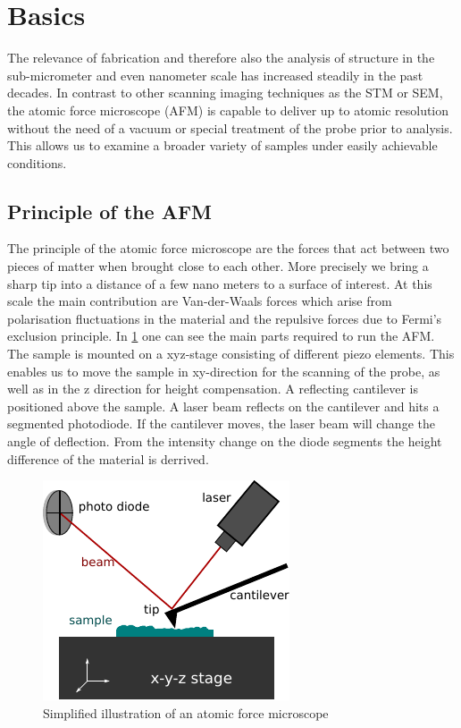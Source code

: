 \documentclass[paper=a4,fontsize=10pt,DIV=18,twocolumn,parskip=half]{scrartcl}
\numberwithin{equation}{section}    %
\begin{document}
\section{Basics}
The relevance of fabrication and therefore also the analysis of structure in the 
sub-micrometer and even nanometer scale has increased steadily in the past 
decades. In contrast to other scanning imaging techniques as the STM or SEM, the 
atomic force microscope (AFM) is capable to deliver up to atomic resolution 
without the need of a vacuum or special treatment of the probe prior to 
analysis. This allows us to examine a broader variety of samples under easily 
achievable conditions.

\subsection{Principle of the AFM}
The principle of the atomic force microscope are the forces that act between two 
pieces of matter when brought close to each other. More precisely we bring a 
sharp tip into a distance of a few nano meters to a surface of interest. At this 
scale the main contribution are Van-der-Waals forces which arise from 
polarisation fluctuations in the material and the repulsive forces due to 
Fermi's exclusion principle. In \cref{afm_scheme} one can see the 
main parts required to run the AFM.  The sample is mounted on a xyz-stage 
consisting of different piezo elements.  This enables us to move the sample in 
xy-direction for the scanning of the probe, as well as in the z direction for 
height compensation. A reflecting cantilever is positioned above the sample. A 
laser beam reflects on the cantilever and hits a segmented photodiode. If the 
cantilever moves, the laser beam will change the angle of deflection.  From the 
intensity change on the diode segments the height difference of the material is 
derrived.

\begin{figure}
    \centering
    \includegraphics{Bilder/afm_scheme.pdf}
    \caption{Simplified illustration of an atomic force microscope}
    \label{afm_scheme}
\end{figure}
\end{document}
